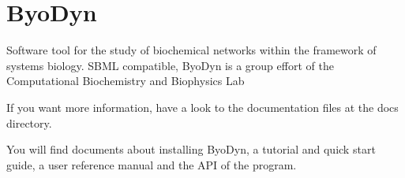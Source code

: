 \chapter{Byo\+Dyn}
\label{md__2home_2jordivilla_2_git_hub_2_treball_2_byo_dyn_2_r_e_a_d_m_e}
\label{md__2home_2jordivilla_2_git_hub_2_treball_2_byo_dyn_2_r_e_a_d_m_e_autotoc_md0}%
 Software tool for the study of biochemical networks within the framework of systems biology. SBML compatible, Byo\+Dyn is a group effort of the Computational Biochemistry and Biophysics Lab

If you want more information, have a look to the documentation files at the docs directory.

You will find documents about installing Byo\+Dyn, a tutorial and quick start guide, a user reference manual and the API of the program. 